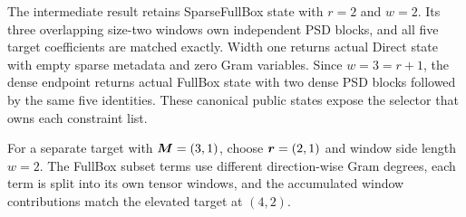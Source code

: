 The intermediate result retains SparseFullBox state with $r=2$ and $w=2$. Its three overlapping size-two windows own independent PSD blocks, and all five target coefficients are matched exactly. Width one returns actual Direct state with empty sparse metadata and zero Gram variables. Since $w=3=r+1$, the dense endpoint returns actual FullBox state with two dense PSD blocks followed by the same five identities. These canonical public states expose the selector that owns each constraint list.

 For a separate target with $\boldsymbol{M}=(3,1)$, choose $\boldsymbol{r}=(2,1)$ and window side length $w=2$. The FullBox subset terms use different direction-wise Gram degrees, each term is split into its own tensor windows, and the accumulated window contributions match the elevated target at $(4,2)$.
\begin{center}
\end{center}

